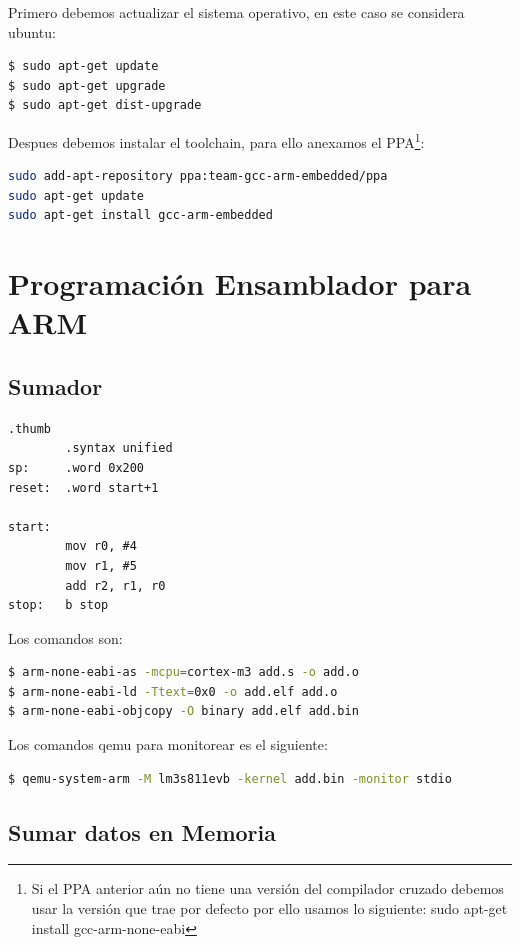 \documentclass[12pt, twoside]{report}
\begin{document}
Primero debemos actualizar el sistema operativo, en este caso se considera ubuntu:

\begin{lstlisting}[language=bash]
$ sudo apt-get update
$ sudo apt-get upgrade
$ sudo apt-get dist-upgrade
\end{lstlisting}

Despues debemos instalar el toolchain, para ello anexamos el PPA\footnote{Si el PPA anterior aún no tiene una versión del compilador cruzado debemos usar la versión que trae por defecto por ello usamos lo siguiente:
sudo apt-get install gcc-arm-none-eabi
}:

\begin{lstlisting}[language=bash]
sudo add-apt-repository ppa:team-gcc-arm-embedded/ppa
sudo apt-get update
sudo apt-get install gcc-arm-embedded
\end{lstlisting}

 \section{Programación Ensamblador para ARM}
 
 \subsection{Sumador}

\begin{lstlisting}[language={[x86masm]Assembler}]
		.thumb
		.syntax unified
sp:		.word 0x200
reset:	.word start+1

start:
		mov r0, #4
		mov r1, #5
		add r2, r1, r0
stop:	b stop
\end{lstlisting} 

Los comandos son:

\begin{lstlisting}[language=bash]
$ arm-none-eabi-as -mcpu=cortex-m3 add.s -o add.o
$ arm-none-eabi-ld -Ttext=0x0 -o add.elf add.o
$ arm-none-eabi-objcopy -O binary add.elf add.bin
\end{lstlisting} 

Los comandos qemu para monitorear es el siguiente:

\begin{lstlisting}[language=bash]
$ qemu-system-arm -M lm3s811evb -kernel add.bin -monitor stdio
\end{lstlisting} 

\subsection{Sumar datos en Memoria}
\end{document}

